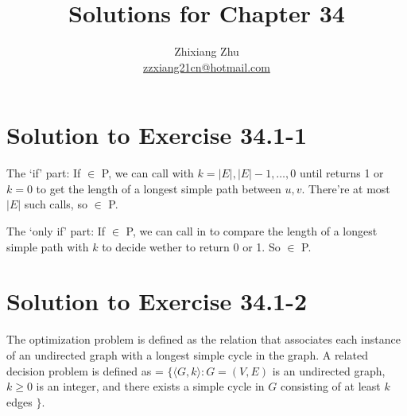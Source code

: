 \documentclass[a4paper, fleqn]{article}
\title{Solutions for Chapter 34}
\author{Zhixiang Zhu  \\\href{mailto:zzxiang21cn@hotmail.com}{zzxiang21cn@hotmail.com}}
\begin{document}
\maketitle

\section*{Solution to Exercise 34.1-1}

The `if' part: If  $\in$ P, we can call  with $k =
|E|, |E| - 1, \ldots, 0$ until  returns 1 or $k = 0$ to get the length
of a longest simple path between $u, v$. There're at most $|E|$ such calls, so
 $\in$ P.

The `only if' part: If  $\in$ P, we can call
 in  to compare the length of a longest
simple path with $k$ to decide wether to return 0 or 1. So  $\in$ P.


\section*{Solution to Exercise 34.1-2}

The optimization problem is defined as the relation that associates each instance of an
undirected graph with a longest simple cycle in the graph. A related decision problem is
defined as  = $\{ \langle G, k \rangle : G = (V, E)$ is
an undirected graph, $k \geq 0$ is an integer, and there exists a simple cycle in $G$
consisting of at least $k$ edges $\}$.
\end{document}
